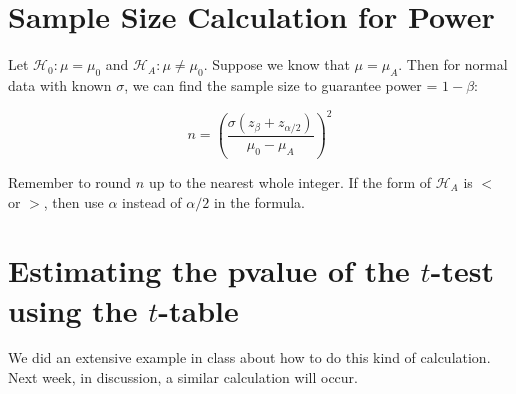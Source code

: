 \documentclass[11 pt]{article}
\newcommand{\ho}{\mathcal{H}_0}
\newcommand{\mun}{\mu_0}
\newcommand{\ha}{\mathcal{H}_A}
\begin{document}
\section*{Sample Size Calculation for Power}
Let $\ho: \mu = \mun$ and $\ha : \mu \neq \mun$. Suppose we know that $\mu = \mu_A$. Then for normal data with known $\sigma$, we can find the sample size to guarantee power = $1 - \beta$:
\begin{framed}
\[
n = \left ( \frac{\sigma (z_{\beta} + z_{\alpha / 2})}{\mun - \mu_A} \right ) ^2
\]
\end{framed}
Remember to round $n$ up to the nearest whole integer. If the form of $\ha$ is $<$ or $>$, then use $\alpha$ instead of $\alpha / 2$ in the formula.

\section*{Estimating the pvalue of the $t$-test using the $t$-table}

We did an extensive example in class about how to do this kind of calculation. Next week, in discussion, a similar calculation will occur.  
\end{document}
